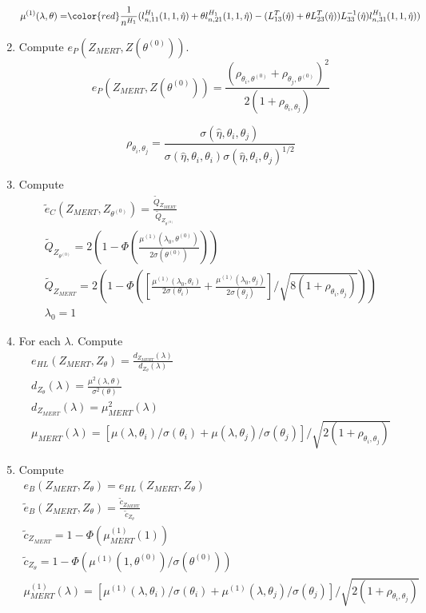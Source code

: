 \documentclass{article}
\begin{document}
\begin{enumerate}[step 1]
\begin{align*}
\mu^{(1)}(\lambda,\theta)=& {\color{red} \frac{1}{n^{H_1}}(l^{H_1}_{n,11}(1,1,\hat{\eta})+\theta l^{H_1}_{n,21}(1,1,\hat{\eta})- (L_{13}^T(\hat{\eta})+\theta L_{23}^T(\hat{\eta}))L_{33}^{-1}(\hat{\eta})l^{H_1}_{n,31}(1,1,\hat\eta))}\\
\end{align*}

\item Compute $e_P(Z_{MERT},Z(\theta^{(0)}))$. $$e_P(Z_{MERT},Z(\theta^{(0)}))=\frac{(\rho_{\theta_i,\theta^{(0)}}+\rho_{\theta_j,\theta^{(0)}})^2}{2(1+\rho_{\theta_i,\theta_j})}$$

$$\rho_{\theta_i,\theta_j}= \frac{\sigma(\hat{\eta},\theta_i,\theta_j)}{{\sigma(\hat{\eta},\theta_i,\theta_i)\sigma(\hat{\eta},\theta_i,\theta_j)}^{1/2}}$$

\item Compute \begin{align*}
\tilde{e}_C(Z_{MERT},Z_{\theta^{(0)}})= \frac{ \tilde{Q}_{Z_{MERT}}}{\tilde{Q}_{Z_{\theta^{(0)}}}}\\
\tilde{Q}_{Z_{\theta^{(0)}}} =  2\left(1-\Phi\left(\frac{\mu^{(1)}(\lambda_0,\theta^{(0)})}{2\sigma(\theta^{(0)})}\right)\right)\\
\tilde{Q}_{Z_{MERT}} =  2\left(1-\Phi\left(\left[\frac{\mu^{(1)}(\lambda_0,\theta_i)}{2\sigma(\theta_i)}+\frac{\mu^{(1)}(\lambda_0,\theta_j)}{2\sigma(\theta_j)}\right]/\sqrt{8(1+\rho_{\theta_i,\theta_j})}\right)\right)\\
\lambda_0 = 1
\end{align*}

\item {\color{blue}For each $\lambda$.} Compute  \begin{align*}
 e_{HL}(Z_{MERT},Z_{\theta}) =\frac{d_{Z_{MERT}}(\lambda)}{d_{Z_{\theta}}(\lambda)}\\
 d_{Z_\theta}(\lambda) =  \frac{\mu^2(\lambda,\theta)}{\sigma^2(\theta)}\\
 d_{Z_{MERT}}(\lambda) = \mu^2_{MERT}(\lambda)\\
 \mu_{MERT}(\lambda)=[\mu(\lambda,\theta_i)/\sigma(\theta_i)+\mu(\lambda,\theta_j)/\sigma(\theta_j)]/\sqrt{2(1+\rho_{\theta_i,\theta_j})}
\end{align*}

\item Compute  \begin{align*}
 e_{B}(Z_{MERT},Z_{\theta}) = e_{HL}(Z_{MERT},Z_{\theta})\\
 \tilde{e}_{B}(Z_{MERT},Z_{\theta}) = \frac{\tilde{c}_{Z_{MERT}}}{\tilde{c}_{Z_{\theta}}}\\
 \tilde{c}_{Z_{MERT}} = 1 - \Phi(\mu^{(1)}_{MERT}(1))\\
 \tilde{c}_{Z_{\theta}} = 1 - \Phi(\mu^{(1)}(1,\theta^{(0)})/\sigma(\theta^{(0)}))\\
 \mu^{(1)}_{MERT}(\lambda)=[\mu^{(1)}(\lambda,\theta_i)/\sigma(\theta_i)+\mu^{(1)}(\lambda,\theta_j)/\sigma(\theta_j)]/\sqrt{2(1+\rho_{\theta_i,\theta_j})}
\end{align*}
\end{enumerate}
\end{document}
